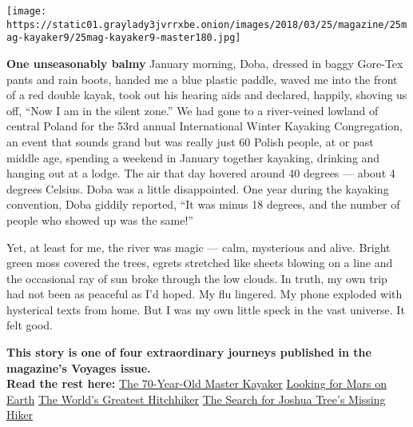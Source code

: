 \texttt{[image: https://static01.graylady3jvrrxbe.onion/images/2018/03/25/magazine/25mag-kayaker9/25mag-kayaker9-master180.jpg]}

\textbf{One unseasonably balmy} January morning, Doba, dressed in baggy
Gore-Tex pants and rain boots, handed me a blue plastic paddle, waved me
into the front of a red double kayak, took out his hearing aids and
declared, happily, shoving us off, ``Now I am in the silent zone.'' We
had gone to a river-veined lowland of central Poland for the 53rd annual
International Winter Kayaking Congregation, an event that sounds grand
but was really just 60 Polish people, at or past middle age, spending a
weekend in January together kayaking, drinking and hanging out at a
lodge. The air that day hovered around 40 degrees --- about 4 degrees
Celsius. Doba was a little disappointed. One year during the kayaking
convention, Doba giddily reported, ``It was minus 18 degrees, and the
number of people who showed up was the same!''

Yet, at least for me, the river was magic --- calm, mysterious and
alive. Bright green moss covered the trees, egrets stretched like sheets
blowing on a line and the occasional ray of sun broke through the low
clouds. In truth, my own trip had not been as peaceful as I'd hoped. My
flu lingered. My phone exploded with hysterical texts from home. But I
was my own little speck in the vast universe. It felt good.

\textbf{This story is one of four extraordinary journeys published in
the magazine's Voyages issue.\\
Read the rest here:}
\href{https://www.nytimes3xbfgragh.onion/interactive/2018/03/22/magazine/voyages-kayaking-across-ocean-at-70.html?action=click\&module=MagazineModule\&pgtype=Article\&region=Body\&contentCollection=Magazine\%0A}{The
70-Year-Old Master Kayaker}
\href{https://www.nytimes3xbfgragh.onion/interactive/2018/03/22/magazine/voyages-nathalie-cabrol-searching-mars-life-on-earth.html?action=click\&module=MagazineModule\&pgtype=Article\&region=Body\&contentCollection=Magazine\%0A}{Looking
for Mars on Earth}
\href{https://www.nytimes3xbfgragh.onion/interactive/2018/03/22/magazine/voyages-worlds-greatest-hitchhiker.html?action=click\&module=MagazineModule\&pgtype=Article\&region=Body\&contentCollection=Magazine\%0A}{The
World's Greatest Hitchhiker}
\href{https://www.nytimes3xbfgragh.onion/interactive/2018/03/22/magazine/voyages-joshua-tree-lost-hiker.html?action=click\&module=MagazineModule\&pgtype=Article\&region=Body\&contentCollection=Magazine\%0A}{The
Search for Joshua Tree's Missing Hiker}

